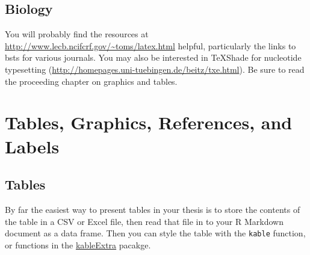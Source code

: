 \documentclass [11pt, proquest] {uwthesis}[2015/03/03]
\begin{document}
\section{Biology}\label{biology}

You will probably find the resources at
\url{http://www.lecb.ncifcrf.gov/~toms/latex.html} helpful, particularly
the links to bsts for various journals. You may also be interested in
TeXShade for nucleotide typesetting
(\url{http://homepages.uni-tuebingen.de/beitz/txe.html}). Be sure to
read the proceeding chapter on graphics and tables.

\chapter{Tables, Graphics, References, and Labels}\label{ref-labels}

\section{Tables}\label{tables}

By far the easiest way to present tables in your thesis is to store the
contents of the table in a CSV or Excel file, then read that file in to
your R Markdown document as a data frame. Then you can style the table
with the \texttt{kable} function, or functions in the
\href{https://cran.r-project.org/web/packages/kableExtra/index.html}{kableExtra}
pacakge.
\end{document}
